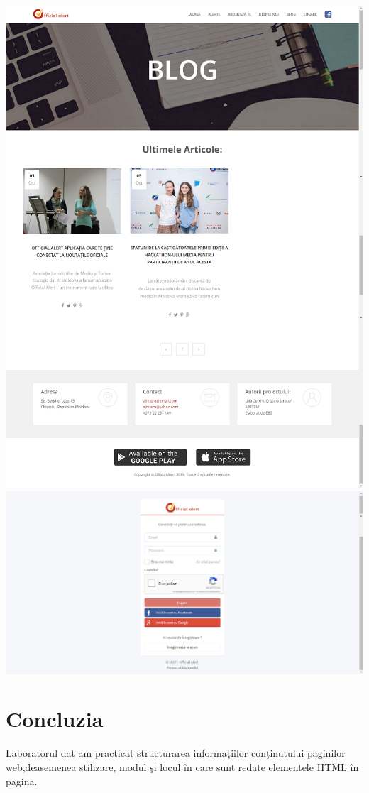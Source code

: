 \documentclass[12pt]{article}
\begin{document}
 \includegraphics{page_blog.png}\\
 \includegraphics{log.png}\\
\section*{Concluzia}
Laboratorul dat am practicat structurarea  informaţiilor conţinutului paginilor web,deasemenea stilizare, modul şi locul în care sunt redate elementele HTML în pagină.
\end{document}
